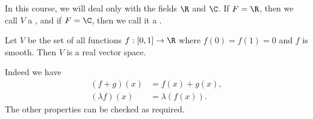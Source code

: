 In this course, we will deal only with the fields $\R$ and $\C$. If $F = \R$, then we call $V$ a , and if $F = \C$, then we call it a .

\begin{example}
  Let $V$ be the set of all functions $f: [0, 1] \rightarrow \R$ where $f(0) = f(1) = 0$ and $f$ is smooth. Then $V$ is a real vector space.

  Indeed we have
  \begin{align*}
      (f + g)(x) &= f(x) + g(x), \\
      (\lambda f)(x) &= \lambda (f(x)).
  \end{align*}
  The other properties can be checked as required.
\end{example}